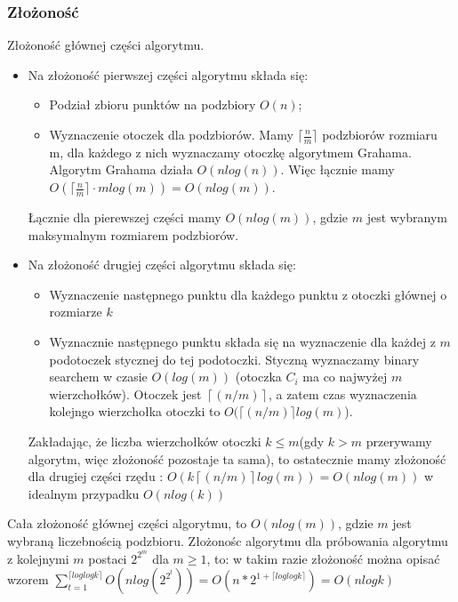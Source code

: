 \documentclass[11pt]{article}
\theoremstyle{remark} \newtheorem{definition}{def.}
\theoremstyle{definition} \newtheorem{twierdzenie}{tw.}
\begin{document}
    \subsubsection{Złożoność}
    Złożoność głównej części algorytmu.
    \begin{itemize}
        \item Na złożoność pierwszej części algorytmu składa się:
                \begin{itemize}
                    \item   Podział zbioru punktów na podzbiory $O(n)$;
                    \item   Wyznaczenie otoczek dla podzbiorów. Mamy $\lceil \frac{n}{m} \rceil$ podzbiorów
                            rozmiaru m, dla każdego z nich wyznaczamy otoczkę algorytmem Grahama.
                            Algorytm Grahama działa $O(nlog(n))$. Więc łącznie mamy $ O(\lceil \frac{n}{m} \rceil \cdot mlog(m)) = O(nlog(m))$.
                \end{itemize}
                Łącznie dla pierewszej części mamy $O(nlog(m))$, gdzie $m$ jest wybranym maksymalnym
                 rozmiarem podzbiorów.

        \item Na złożoność drugiej części algorytmu składa się:
                 \begin{itemize}
                     \item   Wyznaczenie następnego punktu dla każdego punktu z otoczki głównej o rozmiarze $k$
                     \item   Wyznacznie następnego punktu składa się na wyznaczenie dla każdej z $m$ podotoczek
                            stycznej do tej podotoczki. Styczną wyznaczamy binary searchem w czasie $O(log(m))$
                            (otoczka $C_i$ ma co najwyżej $m$ wierzchołków). Otoczek jest $\left\lceil(n/m) \right\rceil$, a zatem czas
                            wyznaczenia kolejngo wierzchołka otoczki to $O(\lceil(n/m)\rceil log(m)$).    
                 \end{itemize}
                 Zakładając, że liczba wierzchołków otoczki $k \le m$(gdy $k > m$ przerywamy algorytm, więc złożoność pozostaje ta sama),
                  to ostatecznie mamy złożoność dla drugiej części rzędu : $O(k \left\lceil(n/m)\right\rceil log(m)) = O(nlog(m)) $ w idealnym przypadku $O(nlog(k))$
    \end{itemize}

    Cała złożoność głównej części algorytmu, to $O(nlog(m))$, gdzie $m$ jest wybraną liczebnością podzbioru.
    Złożonośc algorytmu dla próbowania algorytmu z kolejnymi $m$ postaci $2^{2^m}$ dla $m \ge 1$, to:
    w takim razie złożoność można opisać wzorem $ \sum_{t=1}^{\lceil log log k \rceil} O(n log (2^{2^t})) =
    O(n*2^{1+{\lceil log log k \rceil}})= O(nlog k) $
\end{document}

